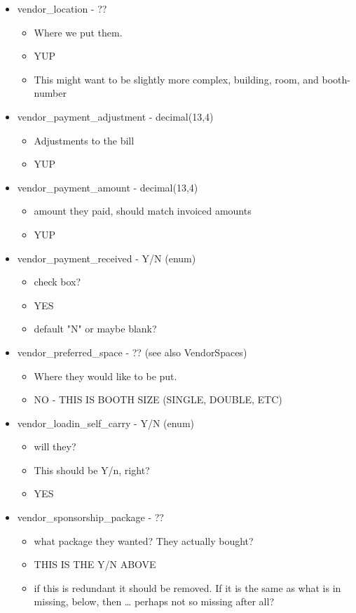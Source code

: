 \documentclass[captions=tablesignature]{scrartcl}
\begin{document}
\begin{itemize}
\item vendor\_location - ??
\label{sec-2-2-13}
\begin{itemize}
\item Where we put them.
\item YUP
\item This might want to be slightly more complex, building, room, and booth-number
\end{itemize}

\item vendor\_payment\_adjustment - decimal(13,4)
\label{sec-2-2-14}
\begin{itemize}
\item Adjustments to the bill
\item YUP
\end{itemize}

\item vendor\_payment\_amount - decimal(13,4)
\label{sec-2-2-15}
\begin{itemize}
\item amount they paid, should match invoiced amounts
\item YUP
\end{itemize}

\item vendor\_payment\_received - Y/N (enum)
\label{sec-2-2-16}
\begin{itemize}
\item check box?
\item YES
\item default "N" or maybe blank?
\end{itemize}

\item vendor\_preferred\_space - ?? (see also VendorSpaces)
\label{sec-2-2-17}
\begin{itemize}
\item Where they would like to be put.
\item NO - THIS IS BOOTH SIZE (SINGLE, DOUBLE, ETC)
\end{itemize}

\item vendor\_loadin\_self\_carry - Y/N (enum)
\label{sec-2-2-18}
\begin{itemize}
\item will they?
\item This should be Y/n, right?
\item YES
\end{itemize}

\item vendor\_sponsorship\_package  - ??
\label{sec-2-2-19}
\begin{itemize}
\item what package they wanted?  They actually bought?
\item THIS IS THE Y/N ABOVE
\item if this is redundant it should be removed.  If it is the same as
what is in missing, below, then \ldots{} perhaps not so missing after
all?
\end{itemize}


\end{itemize}
\end{document}
